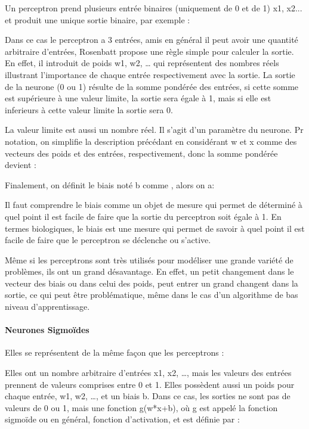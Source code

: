 \documentclass[conference,onecolumn]{IEEEtran}
\begin{document}
Un perceptron prend plusieurs entrée binaires (uniquement de 0 et de 1) x1, x2... et produit une unique sortie binaire, par exemple : 


Dans ce cas le perceptron a 3 entrées, amis en général il peut avoir une quantité arbitraire d’entrées, Rosenbatt propose une règle simple pour calculer la sortie. En effet, il introduit de poids w1, w2, … qui représentent des nombres réels illustrant l’importance de chaque entrée respectivement avec la sortie. La sortie de la neurone (0 ou 1)  résulte de la somme pondérée des entrées, si cette somme est supérieure à une valeur limite, la sortie sera égale à 1, mais si elle est inferieurs à cette valeur limite la sortie sera 0. 


La valeur limite est aussi un nombre réel. Il s’agit d’un paramètre du neurone. Pr notation, on simplifie la description précédant en considérant w et x comme des vecteurs des poids et des entrées, respectivement, donc la somme pondérée devient : 


Finalement, on définit le biais noté b comme %
, alors on a: 


Il faut comprendre le biais comme un objet de mesure qui permet de déterminé à quel point il est facile de faire que la sortie du perceptron soit égale à 1. En termes biologiques, le biais est une mesure qui permet de savoir à quel point il est facile de faire que le perceptron se déclenche ou s’active. 

Même si les perceptrons sont très utilisés pour modéliser une grande variété de problèmes, ils ont un grand désavantage. En effet, un petit changement dans le vecteur des biais ou dans celui des poids, peut entrer un grand changent dans la sortie, ce qui peut être problématique, même dans le cas d’un algorithme de bas niveau d’apprentissage.  

\paragraph{Neurones Sigmoïdes}
Elles se représentent de la même façon que les perceptrons : 


Elles ont un nombre arbitraire d’entrées x1, x2, …, mais les valeurs des entrées prennent de valeurs comprises entre 0 et 1. Elles possèdent aussi un poids pour chaque entrée, w1, w2, …, et un biais b. Dans ce cas, les sorties ne sont pas de valeurs de 0 ou 1, mais une fonction g(w*x+b), où g est appelé la fonction sigmoïde ou en général, fonction d’activation, et est définie par : 
\end{document}
